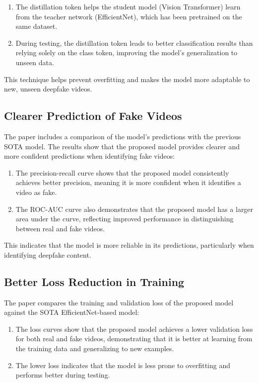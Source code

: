 \documentclass{report}
\begin{document}
	\begin{enumerate}
		\item 
		The distillation token helps the student model (Vision Transformer) learn from the teacher network (EfficientNet), which has been pretrained on the same dataset.
		
		\item 
		During testing, the distillation token leads to better classification results than relying solely on the class token, improving the model's generalization to unseen data.
	\end{enumerate}
	This technique helps prevent overfitting and makes the model more adaptable to new, unseen deepfake videos.
	
	
	
	\subsection{Clearer Prediction of Fake Videos}
	The paper includes a comparison of the model’s predictions with the previous SOTA model. The results show that the proposed model provides clearer and more confident predictions when identifying fake videos:
	
	\begin{enumerate}
		\item 
		The precision-recall curve shows that the proposed model consistently achieves better precision, meaning it is more confident when it identifies a video as fake.
		
		\item 
		The ROC-AUC curve also demonstrates that the proposed model has a larger area under the curve, reflecting improved performance in distinguishing between real and fake videos.
	\end{enumerate}
	This indicates that the model is more reliable in its predictions, particularly when identifying deepfake content.
	
	
	
	\subsection{Better Loss Reduction in Training}
	The paper compares the training and validation loss of the proposed model against the SOTA EfficientNet-based model:
	\begin{enumerate}
		\item 
		The loss curves show that the proposed model achieves a lower validation loss for both real and fake videos, demonstrating that it is better at learning from the training data and generalizing to new examples.
		
		\item 
		The lower loss indicates that the model is less prone to overfitting and performs better during testing.
	\end{enumerate}
	
\end{document}
